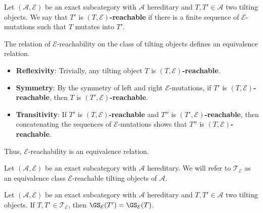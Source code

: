 \begin{definition}
Let $(\mathscr{A},\mathcal{E})$ be an exact subcategory with $\mathscr{A}$ hereditary and $T,T' \in \mathscr{A}$ two tilting objects. We say that $T'$ is \textbf{$(T,\mathcal{E})$-reachable} if there is a finite sequence of $\mathcal{E}$-mutations such that $T$ mutates into $T'$.
\end{definition}

\begin{remark}
The relation of $\mathcal{E}$-reachability on the class of tilting objects defines an equivalence relation.
\end{remark}


\begin{itemize}
    \item \textbf{Reflexivity}: Trivially, any tilting object $T$ is \textbf{$(T,\mathcal{E})$-reachable}.
    \item \textbf{Symmetry}: By the symmetry of left and right $\mathcal{E}$-mutations, if $T'$ is  \textbf{$(T,\mathcal{E})$-reachable}, then $T$ is  \textbf{$(T',\mathcal{E})$-reachable}.
    \item \textbf{Transitivity}: If $T'$ is \textbf{$(T,\mathcal{E})$-reachable} and $T''$ is \textbf{$(T',\mathcal{E})$-reachable}, then concatenating the sequences of $\mathcal{E}$-mutations shows that $T''$ is \textbf{$(T,\mathcal{E})$-reachable}.
\end{itemize}

Thus, $\mathcal{E}$-reachability is an equivalence relation.


\begin{definition}
Let $(\mathscr{A},\mathcal{E})$ be an exact subcategory with $\mathscr{A}$ hereditary. We will refer to $\mathcal{T}_\mathcal{E}$ as an equivalence class $\mathcal{E}$-reachable tilting objects of $\mathscr{A}$.
 
\end{definition}

\begin{prop}
\label{prop:Tstable}
Let $(\mathscr{A},\mathcal{E})$ be an exact subcategory with $\mathscr{A}$ hereditary and $T,T' \in \mathscr{A}$ two tilting objects. If $T,T' \in \mathcal{T}_\mathcal{E}$, then $\GS_\mathcal{E}(T') = \GS_\mathcal{E}(T)$.
\end{prop}

